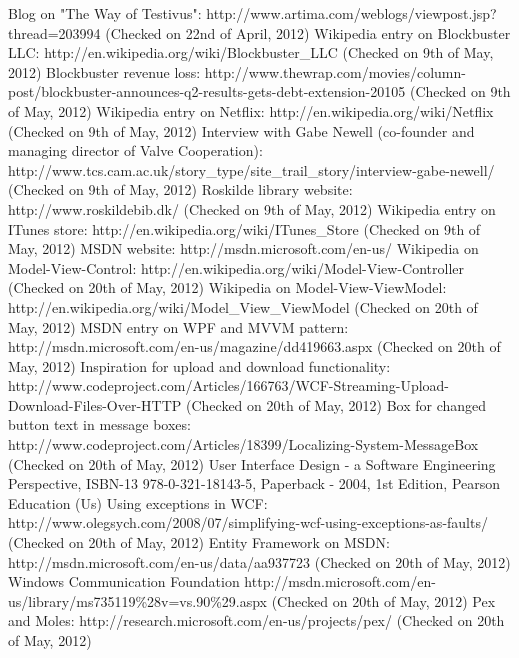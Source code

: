 \begin{thebibliography}{9}
\label{Biblio}
 Blog on "The Way of Testivus": http://www.artima.com/weblogs/viewpost.jsp?thread=203994 (Checked on 22nd of April, 2012)
 Wikipedia entry on Blockbuster LLC: http://en.wikipedia.org/wiki/Blockbuster\_LLC (Checked on 9th of May, 2012)
 Blockbuster revenue loss:  http://www.thewrap.com/movies/column-post/blockbuster-announces-q2-results-gets-debt-extension-20105 (Checked on 9th of May, 2012)
 Wikipedia entry on Netflix: http://en.wikipedia.org/wiki/Netflix (Checked on 9th of May, 2012)
 Interview with Gabe Newell (co-founder and managing director of Valve Cooperation): http://www.tcs.cam.ac.uk/story\_type/site\_trail\_story/interview-gabe-newell/ (Checked on 9th of May, 2012)
 Roskilde library website: http://www.roskildebib.dk/ (Checked on 9th of May, 2012)
 Wikipedia entry on ITunes store: http://en.wikipedia.org/wiki/ITunes\_Store (Checked on 9th of May, 2012)
 MSDN website: http://msdn.microsoft.com/en-us/ 
 Wikipedia on Model-View-Control: http://en.wikipedia.org/wiki/Model-View-Controller (Checked on 20th of May, 2012)
 Wikipedia on Model-View-ViewModel: http://en.wikipedia.org/wiki/Model\_View\_ViewModel (Checked on 20th of May, 2012)
 MSDN entry on WPF and MVVM pattern: http://msdn.microsoft.com/en-us/magazine/dd419663.aspx (Checked on 20th of May, 2012)
 Inspiration for upload and download functionality:  http://www.codeproject.com/Articles/166763/WCF-Streaming-Upload-Download-Files-Over-HTTP (Checked on 20th of May, 2012)
 Box for changed button text in message boxes: http://www.codeproject.com/Articles/18399/Localizing-System-MessageBox (Checked on 20th of May, 2012)
 User Interface Design - a Software Engineering Perspective, ISBN-13 978-0-321-18143-5, Paperback - 2004, 1st Edition, Pearson Education (Us)
 Using exceptions in WCF: http://www.olegsych.com/2008/07/simplifying-wcf-using-exceptions-as-faults/ (Checked on 20th of May, 2012)
 Entity Framework on MSDN: http://msdn.microsoft.com/en-us/data/aa937723 (Checked on 20th of May, 2012)
 Windows Communication Foundation http://msdn.microsoft.com/en-us/library/ms735119\%28v=vs.90\%29.aspx (Checked on 20th of May, 2012)
 Pex and Moles: http://research.microsoft.com/en-us/projects/pex/ (Checked on 20th of May, 2012)
\end{thebibliography}
